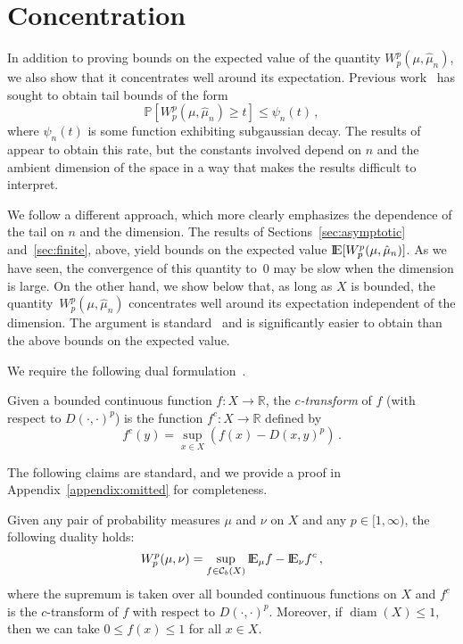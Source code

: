 \documentclass[sts]{imsart}
\newcommand{\RR}{\mathbb{R}}
\newcommand{\p}{\mathbb{P}}
\DeclareMathOperator{\diam}{diam}
\begin{document}
\section{Concentration}\label{sec:concentration}
In addition to proving bounds on the expected value of the quantity $W_p^p(\mu, \hat \mu_n)$, we also show that it concentrates well around its expectation.
Previous work~\cite{BolGuiVil07,Boi11} has sought to obtain tail bounds of the form
\begin{equation*}
\p[W_p^p(\mu, \hat \mu_n) \geq t] \leq \psi_n(t)\,,
\end{equation*}
where $\psi_n(t)$ is some function exhibiting subgaussian decay.
The results of~\cite{BolGuiVil07} appear to obtain this rate, but the constants involved depend on $n$ and the ambient dimension of the space in a way that makes the results difficult to interpret.

We follow a different approach, which more clearly emphasizes the dependence of the tail on $n$ and the dimension.
The results of Sections~\ref{sec:asymptotic} and~\ref{sec:finite}, above, yield bounds on the expected value ${\rm I}\kern-0.18em{\rm E}[W_p^p(\mu, \hat \mu_n)]$.
As we have seen, the convergence of this quantity to~$0$ may be slow when the dimension is large.
On the other hand, we show below that, as long as $X$ is bounded, the quantity~$W_p^p(\mu, \hat \mu_n)$ concentrates well around its expectation independent of the dimension.
The argument is standard~\cite{Tal92} and is significantly easier to obtain than the above bounds on the expected value.

We require the following dual formulation~\cite{RusRac90,Rus91}.
\begin{definition}
Given a bounded continuous function $f: X \to \RR$, the \emph{$c$-transform} of $f$ (with respect to $D(\cdot, \cdot)^p$) is the function $f^c: X \to \RR$ defined by
\begin{equation*}
f^c(y) = \sup_{x \in X} (f(x) - D(x, y)^p)\,.
\end{equation*}
\end{definition}
The following claims are standard, and we provide a proof in Appendix~\ref{appendix:omitted} for completeness.
\begin{proposition}\label{prop:duality}
Given any pair of probability measures $\mu$ and $\nu$ on $X$ and any $p \in [1, \infty)$, the following duality holds:
\begin{equation}\label{eqn:dual_def}
W_p^p(\mu, \nu) = \sup_{f \in \mathcal{C}_b(X)} {\rm I}\kern-0.18em{\rm E}_\mu f - {\rm I}\kern-0.18em{\rm E}_\nu f^c\,,
\end{equation}
where the supremum is taken over all bounded continuous functions on $X$ and $f^c$ is the $c$-transform of $f$ with respect to $D(\cdot, \cdot)^p$.
Moreover, if $\diam(X) \leq 1$, then we can take $0 \leq f(x) \leq 1$ for all $x \in X$.
\end{proposition}
\end{document}
